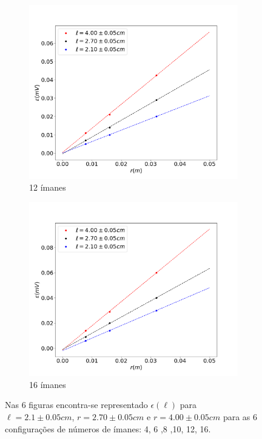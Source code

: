 \documentclass[11pt]{report}
\begin{document}
\begin{figure}[H]
\begin{subfigure}{.5\textwidth}
	  \includegraphics[width=1\linewidth]{i12rfem.png}
	  \caption{12 ímanes}
	  \label{fig:sub2}
	\end{subfigure}%
	\begin{subfigure}{.5\textwidth}
	  \centering
	  \includegraphics[width=1\linewidth]{i16rfem.png}
	  \caption{16 ímanes}
	  \label{fig:sub2}
	\end{subfigure}
	\label{fig:test}
	\caption{Nas 6 figuras encontra-se representado $\epsilon(\ell)$ para $\ell=2.1\pm0.05cm$, $r=2.70\pm0.05cm$ e $r=4.00\pm0.05cm$ para as 6 configurações de números de ímanes: 4, 6 ,8 ,10, 12, 16.}
	\end{figure}
\end{document}
